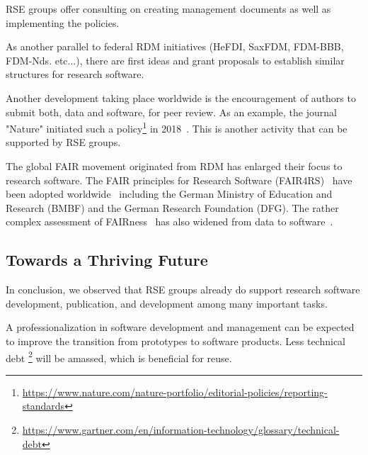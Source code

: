 \documentclass[a4paper]{article}
\begin{document}
RSE groups offer consulting on creating management documents as well as implementing the policies.

As another parallel to federal RDM initiatives (HeFDI, SaxFDM, FDM-BBB, FDM-Nds. etc...), there are first ideas and grant proposals to establish similar structures for research software. 

Another development taking place worldwide is the encouragement of authors to submit both, data and software, for peer review. As an example, the journal "Nature" initiated such a policy\footnote{\url{https://www.nature.com/nature-portfolio/editorial-policies/reporting-standards}} in 2018~\autocite{Nature2018}.
This is another activity that can be supported by RSE groups. 

The global FAIR movement originated from RDM has enlarged their focus to research software. The FAIR principles for Research Software (FAIR4RS)~\autocite{ChueHong2022} have been adopted worldwide~\autocite{Barker2024} 
including the German Ministry of Education and Research (BMBF) and the German Research Foundation (DFG). 
The rather complex assessment of FAIRness~\autocite{Wilkinson2023,FAIRmaturity} has also widened from data to software~\autocite{Lamprecht2020}.


\subsection{Towards a Thriving Future}

In conclusion, we observed that RSE groups already do support research software development, publication, and development among many important tasks. 


A professionalization in software development and management can be expected to improve the transition from prototypes to software products.%
Less technical debt \footnote{\url{https://www.gartner.com/en/information-technology/glossary/technical-debt}} will be amassed, which is beneficial for reuse.
\end{document}

